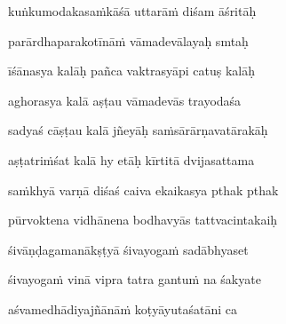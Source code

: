 kuṅkumodakasaṁkāśā uttarāṁ diśam āśritāḥ\thinspace{\dandab} \dontdisplaylinenum

parārdhaparakotīnāṁ vāmadevālayaḥ smtaḥ \veg\dontdisplaylinenum
{}

īśānasya kalāḥ pañca vaktrasyāpi catuṣ kalāḥ\thinspace{\dandab} \dontdisplaylinenum

aghorasya kalā aṣṭau vāmadevās trayodaśa \veg\dontdisplaylinenum
{}

sadyaś cāṣṭau kalā jñeyāḥ saṁsārārṇavatārakāḥ\thinspace{\dandab} \dontdisplaylinenum

aṣṭatriṁśat kalā hy etāḥ kīrtitā dvijasattama \veg\dontdisplaylinenum
{}

saṁkhyā varṇā diśaś caiva ekaikasya pthak pthak\thinspace{\dandab} \dontdisplaylinenum

pūrvoktena vidhānena bodhavyās tattvacintakaiḥ \veg\dontdisplaylinenum
{}

śivāṇḍagamanākṣṭyā śivayogaṁ sadābhyaset\thinspace{\dandab} \dontdisplaylinenum

śivayogaṁ vinā vipra tatra gantuṁ na śakyate \veg\dontdisplaylinenum
{}

aśvamedhādiyajñānāṁ koṭyāyutaśatāni ca\thinspace{\dandab} \dontdisplaylinenum

